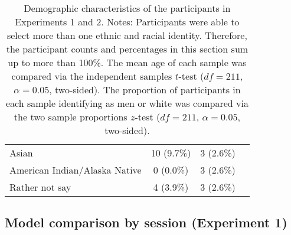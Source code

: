 \documentclass[a4paper,12pt]{article}
\begin{document}
\begin{refsection}[supp]
\begin{table}[h]
\begin{tabular*}{\textwidth}{lccc}
    \hspace{1em} Asian                     & 10  (9.7\%) &   3  (2.6\%) & \\
    \hspace{1em} American Indian/Alaska Native & 0 (0.0\%) & 3 (2.6\%) & \\
    \hspace{1em} Rather not say            &  4  (3.9\%) &  3  (2.6\%) & \\
    \bottomrule
    \end{tabular*}
    \caption{Demographic characteristics of the participants in Experiments 1 and 2. Notes: Participants were able to select more than one ethnic and racial identity. Therefore, the participant counts and percentages in this section sum up to more than 100\%. The mean age of each sample was compared via the independent samples $t$-test ($df = 211$, $\alpha = 0.05$, two-sided). The proportion of participants in each sample identifying as men or white was compared via the two sample proportions $z$-test ($df = 211$, $\alpha = 0.05$, two-sided).}
    \label{tab:demographics}
\end{table}

\clearpage
\subsection*{Model comparison by session (Experiment 1)}


\end{refsection}
\end{document}
